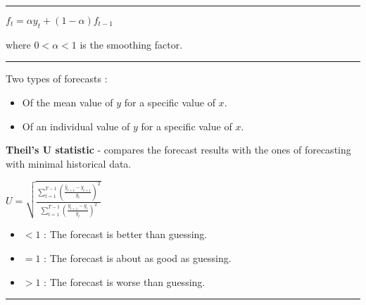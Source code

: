 \hrule

\begin{f}

\begin{center}
	$f_{t} = \alpha y_{t} + (1 - \alpha) f_{t - 1}$
\end{center}

where $0 < \alpha < 1$ is the smoothing factor.

\end{f}  \hrule

\begin{f}[Forecasts]

Two types of forecasts :

\begin{itemize}[leftmargin=*]
	\item Of the mean value of $y$ for a specific value of $x$.
	\item Of an individual value of $y$ for a specific value of $x$.
\end{itemize}

\textbf{Theil's U statistic} - compares the forecast results with the ones of forecasting with minimal historical data.

\begin{center}
	$U = \sqrt{\frac{\sum_{t=1}^{T-1} \left( \frac{\hat{y}_{t+1} - y_{t+1}}{y_t} \right)^2}{\sum_{t=1}^{T-1} \left( \frac{y_ {t+1} - y_t}{y_t} \right)^2}}$
\end{center}

\begin{itemize}[leftmargin=*]
	\item $< 1$ : The forecast is better than guessing.
	\item $= 1$ : The forecast is about as good as guessing.
	\item $> 1$ : The forecast is worse than guessing.
\end{itemize}



\end{f}  \hrule

